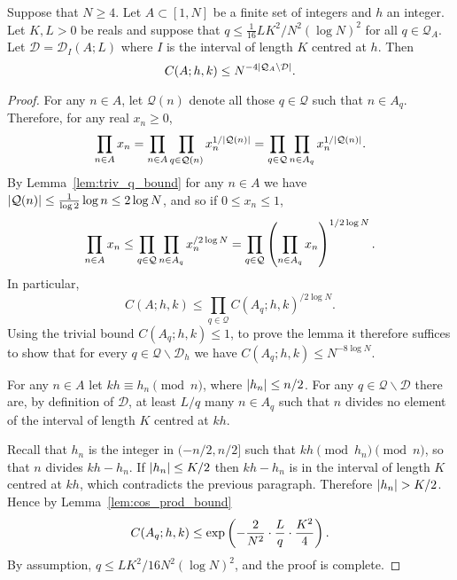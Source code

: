 \begin{lemma}\label{lem:minor2_ind_bound}
Suppose that $N\geq 4$. Let $A\subset [1,N]$ be a finite set of integers and $h$ an integer. Let $K,L>0$ be reals and suppose that $q\leq \tfrac{1}{16}LK^2/N^2(\log N)^2$ for all $q\in \mathcal{Q}_A$. Let $\mathcal{D}=\mathcal{D}_I(A;L)$ where $I$ is the interval of length $K$ centred at $h$. Then
\[C(A;h,k)\leq N^{-4\left\lvert \mathcal{Q}_A\backslash\mathcal{D}\right\rvert}.\]
\end{lemma}
\begin{proof}
For any $n\in A$, let $\mathcal{Q}(n)$ denote all those $q\in \mathcal{Q}$ such that $n\in A_q$. Therefore, for any real $x_n\geq 0$,
\[\prod_{n\in A}x_n=\prod_{n\in A}\prod_{q\in \mathcal{Q}(n)}x_n^{1/\left\lvert \mathcal{Q}(n)\right\rvert}
=\prod_{q\in\mathcal{Q}}\prod_{n\in A_q}x_n^{1/\left\lvert \mathcal{Q}(n)\right\rvert}.\]
By Lemma~\ref{lem:triv_q_bound} for any $n\in A$ we have $\left\lvert \mathcal{Q}(n)\right\rvert\leq \tfrac{1}{\log 2}\log n\leq 2\log N$, and so if $0\leq x_n\leq 1$,
\[\prod_{n\in A}x_n\leq \prod_{q\in\mathcal{Q}}\prod_{n\in A_q}x_n^{/2\log N}=\prod_{q\in \mathcal{Q}}\left( \prod_{n\in A_q}x_n\right)^{1/2\log N}.\]
In particular,
 \[C(A;h,k)\leq \prod_{q\in \mathcal{Q}}C(A_q;h,k)^{/2\log N}.\]
 Using the trivial bound $C(A_q;h,k)\leq 1$, to prove the lemma it therefore suffices to show that for every $q\in\mathcal{Q}\backslash\mathcal{D}_h$ we have $C(A_q;h,k)\leq N^{-8\log N}$.

For any $n\in A$ let $kh\equiv h_n\pmod{n}$, where $\left\lvert h_n\right\rvert\leq n/2$. For any $q\in\mathcal{Q}\backslash \mathcal{D}$ there are, by definition of $\mathcal{D}$, at least $L/q$ many $n\in A_q$ such that $n$ divides no element of the interval of length $K$ centred at $kh$. 

Recall that $h_n$ is the integer in $(-n/2,n/2]$ such that $kh\pmod h_n\pmod{n}$, so that $n$ divides $kh-h_n$. If $\left\lvert h_n\right\rvert\leq K/2$ then $kh-h_n$ is in the interval of length $K$ centred at $kh$, which contradicts the previous paragraph. Therefore $\left\lvert h_n\right\rvert>K/2$. Hence by Lemma~\ref{lem:cos_prod_bound}
\[C(A_q;h,k)\leq\exp\left( -\frac{2}{N^2}\cdot \frac{L}{q}\cdot \frac{K^2}{4}\right).\]
By assumption, $q\leq LK^2/16N^2(\log N)^2$, and the proof is complete.
\end{proof}

